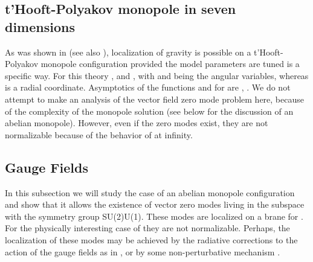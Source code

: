 \documentclass[a4paper,12pt]{article}
\begin{document}
\subsection{t'Hooft-Polyakov monopole in seven dimensions}
As was shown in \cite{Gherghetta:2000jf} (see also \cite{ewald}),
localization of gravity is possible on a t'Hooft-Polyakov monopole
configuration provided the model parameters are tuned is a
specific way. For this theory \coordHE{}, and \coordHE{}, with
\myHighlight{$0\leq\theta\leq\pi$}\coordHE{} and \myHighlight{$0\leq \varphi\leq 2\pi$}\coordHE{} being the
angular variables, whereas \coordHE{} is a radial
coordinate. Asymptotics of the functions \coordHE{} and \coordHE{} for \coordHE{} are \coordHE{}, \coordHE{}. We do not attempt to
make an analysis of the vector field zero mode problem here,
because of the complexity of the monopole solution (see below for
the discussion of an abelian monopole). However, even if the zero
modes exist, they are not normalizable because of the behavior of
\coordHE{} at infinity.

\subsection {\coordHE{} Gauge Fields}
In this subsection we will study the case of an abelian monopole
configuration and show that it allows the existence of vector zero
modes living in the \coordHE{} subspace with the symmetry group
SU(2)\myHighlight{$\times$}\coordHE{}U(1). These modes are localized on a brane for \coordHE{}. For the physically interesting case of \coordHE{} they are not
normalizable. Perhaps, the localization of these modes may be
achieved by the radiative corrections to the action of the gauge
fields as in \cite{Dvali:2000rx}, or by some non-perturbative
mechanism \cite{Dvali:1996xe,Dubovsky:2001pe}.
\end{document}
